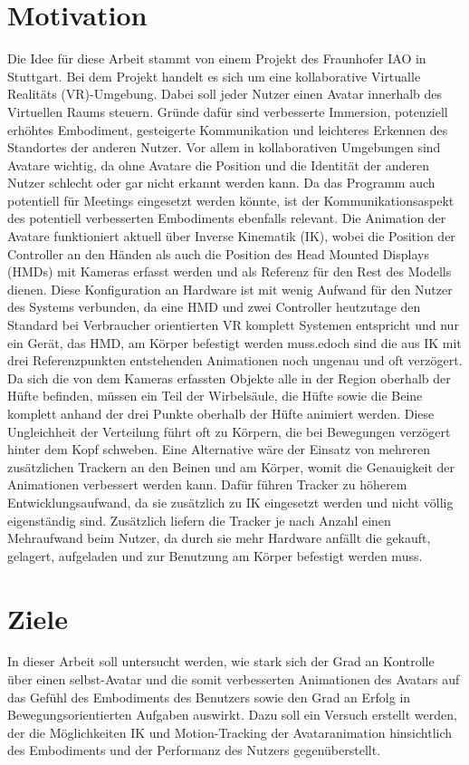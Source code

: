 \section{Motivation}
Die Idee für diese Arbeit stammt von einem Projekt des Fraunhofer IAO in Stuttgart. Bei dem Projekt handelt es sich um eine kollaborative Virtualle Realitäts (VR)-Umgebung. Dabei soll jeder Nutzer einen Avatar innerhalb des Virtuellen Raums steuern. 
Gründe dafür sind verbesserte Immersion, potenziell erhöhtes Embodiment, gesteigerte Kommunikation und leichteres Erkennen des Standortes der anderen Nutzer. Vor allem in kollaborativen Umgebungen sind Avatare wichtig, da ohne Avatare die Position und die Identität der anderen Nutzer schlecht oder gar nicht erkannt werden kann. Da das Programm auch potentiell für Meetings eingesetzt werden könnte, ist der Kommunikationsaspekt des potentiell verbesserten Embodiments ebenfalls relevant. Die Animation der Avatare funktioniert aktuell über Inverse Kinematik (IK), wobei die Position der Controller an den Händen als auch die Position des Head Mounted Displays (HMDs) mit Kameras erfasst werden und als Referenz für den Rest des Modells dienen. Diese Konfiguration an Hardware ist mit wenig Aufwand für den Nutzer des Systems verbunden, da eine HMD und zwei Controller heutzutage den Standard bei Verbraucher orientierten VR komplett Systemen entspricht und nur ein Gerät, das HMD, am Körper befestigt werden muss.edoch sind die aus IK mit drei Referenzpunkten entstehenden Animationen noch ungenau und oft verzögert. Da sich die von dem Kameras erfassten Objekte alle in der Region oberhalb der Hüfte befinden, müssen ein Teil der Wirbelsäule, die Hüfte sowie die Beine komplett anhand der drei Punkte oberhalb der Hüfte animiert werden. Diese Ungleichheit der Verteilung führt oft zu Körpern, die bei Bewegungen verzögert hinter dem Kopf schweben.
Eine Alternative wäre der Einsatz von mehreren zusätzlichen Trackern an den Beinen und am Körper, womit die Genauigkeit der Animationen verbessert werden kann. Dafür führen Tracker zu höherem Entwicklungsaufwand, da sie zusätzlich zu IK eingesetzt werden und nicht völlig eigenständig sind. Zusätzlich liefern die Tracker je nach Anzahl einen Mehraufwand beim Nutzer, da durch sie mehr Hardware anfällt die gekauft, gelagert, aufgeladen und zur Benutzung am Körper befestigt werden muss.


\section{Ziele}
In dieser Arbeit soll untersucht werden, wie stark sich der Grad an Kontrolle über einen selbst-Avatar und die somit verbesserten Animationen des Avatars auf das Gefühl des Embodiments des Benutzers  sowie den Grad an Erfolg in Bewegungsorientierten Aufgaben auswirkt. Dazu soll ein Versuch erstellt werden, der die Möglichkeiten IK und Motion-Tracking der Avataranimation hinsichtlich des Embodiments und der Performanz des Nutzers gegenüberstellt.


